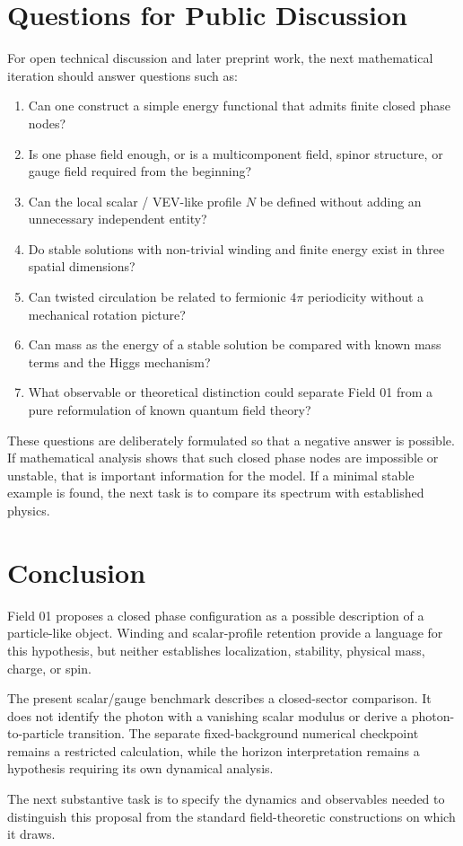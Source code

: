 \documentclass[11pt,a4paper]{article}
\begin{document}
\section{Questions for Public Discussion}

For open technical discussion and later preprint work, the next mathematical iteration should answer questions such as:
\begin{enumerate}
\item Can one construct a simple energy functional that admits finite closed phase nodes?
\item Is one phase field enough, or is a multicomponent field, spinor structure, or gauge field required from the beginning?
\item Can the local scalar / VEV-like profile $N$ be defined without adding an unnecessary independent entity?
\item Do stable solutions with non-trivial winding and finite energy exist in three spatial dimensions?
\item Can twisted circulation be related to fermionic $4\pi$ periodicity without a mechanical rotation picture?
\item Can mass as the energy of a stable solution be compared with known mass terms and the Higgs mechanism?
\item What observable or theoretical distinction could separate Field 01 from a pure reformulation of known quantum field theory?
\end{enumerate}

These questions are deliberately formulated so that a negative answer is possible. If mathematical analysis shows that such closed phase nodes are impossible or unstable, that is important information for the model. If a minimal stable example is found, the next task is to compare its spectrum with established physics.

\section{Conclusion}

Field 01 proposes a closed phase configuration as a possible description of a particle-like object. Winding and scalar-profile retention provide a language for this hypothesis, but neither establishes localization, stability, physical mass, charge, or spin.

The present scalar/gauge benchmark describes a closed-sector comparison. It does not identify the photon with a vanishing scalar modulus or derive a photon-to-particle transition. The separate fixed-background numerical checkpoint remains a restricted calculation, while the horizon interpretation remains a hypothesis requiring its own dynamical analysis.

The next substantive task is to specify the dynamics and observables needed to distinguish this proposal from the standard field-theoretic constructions on which it draws.
\end{document}
